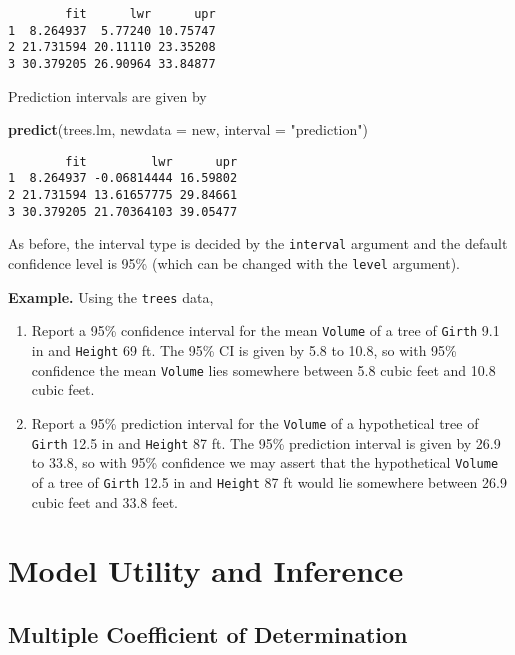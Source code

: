 \documentclass[]{book}
\newenvironment{Shaded}{\begin{snugshade}}{\end{snugshade}}
\newcommand{\KeywordTok}[1]{\textcolor[rgb]{0.13,0.29,0.53}{\textbf{{#1}}}}
\newcommand{\DataTypeTok}[1]{\textcolor[rgb]{0.13,0.29,0.53}{{#1}}}
\newcommand{\StringTok}[1]{\textcolor[rgb]{0.31,0.60,0.02}{{#1}}}
\newcommand{\NormalTok}[1]{{#1}}
\providecommand{\tightlist}{%
  \setlength{\itemsep}{0pt}\setlength{\parskip}{0pt}}
\numberwithin{equation}{chapter}
\numberwithin{figure}{chapter}
\theoremstyle{plain}
\theoremstyle{definition}
\theoremstyle{remark}
\theoremstyle{definition}
\theoremstyle{definition}
\theoremstyle{remark}
\begin{document}
\begin{verbatim}
        fit      lwr      upr
1  8.264937  5.77240 10.75747
2 21.731594 20.11110 23.35208
3 30.379205 26.90964 33.84877
\end{verbatim}

Prediction intervals are given by

\begin{Shaded}
\begin{Highlighting}[]
\KeywordTok{predict}\NormalTok{(trees.lm, }\DataTypeTok{newdata =} \NormalTok{new, }\DataTypeTok{interval =} \StringTok{"prediction"}\NormalTok{)}
\end{Highlighting}
\end{Shaded}

\begin{verbatim}
        fit         lwr      upr
1  8.264937 -0.06814444 16.59802
2 21.731594 13.61657775 29.84661
3 30.379205 21.70364103 39.05477
\end{verbatim}

As before, the interval type is decided by the \texttt{interval}
argument and the default confidence level is 95\% (which can be changed
with the \texttt{level} argument).

\textbf{Example.} Using the \texttt{trees} data,

\begin{enumerate}
\def\labelenumi{\arabic{enumi}.}
\tightlist
\item
  Report a 95\% confidence interval for the mean \texttt{Volume} of a
  tree of \texttt{Girth} 9.1 in and \texttt{Height} 69 ft. The 95\% CI
  is given by 5.8 to 10.8, so with 95\% confidence the mean
  \texttt{Volume} lies somewhere between 5.8 cubic feet and 10.8 cubic
  feet.
\item
  Report a 95\% prediction interval for the \texttt{Volume} of a
  hypothetical tree of \texttt{Girth} 12.5 in and \texttt{Height} 87 ft.
  The 95\% prediction interval is given by 26.9 to 33.8, so with 95\%
  confidence we may assert that the hypothetical \texttt{Volume} of a
  tree of \texttt{Girth} 12.5 in and \texttt{Height} 87 ft would lie
  somewhere between 26.9 cubic feet and 33.8 feet.
\end{enumerate}

\section{Model Utility and Inference}\label{sec-model-utility-and-mlr}

\subsection{Multiple Coefficient of
Determination}\label{multiple-coefficient-of-determination}
\end{document}
